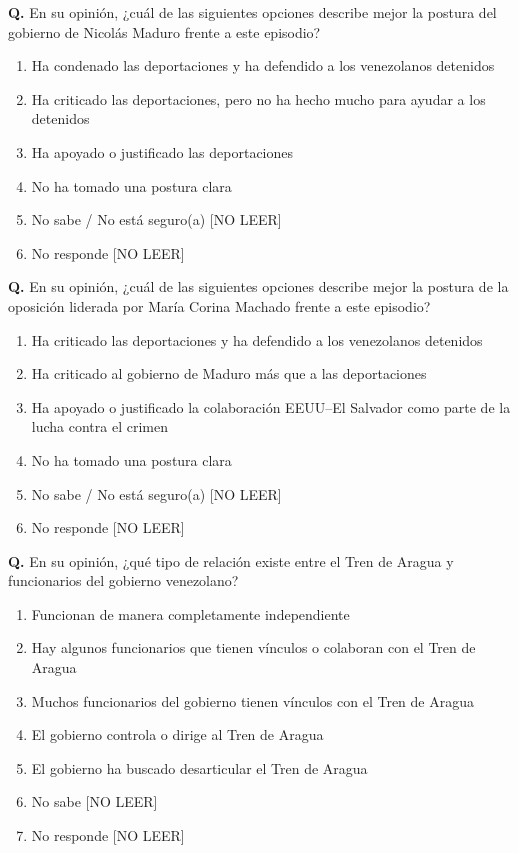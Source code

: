 \documentclass[11pt,letterpaper]{article}
\newcounter{question}
\newcommand{\question}[1]{%
  \stepcounter{question}%
  \vspace{0.3em}%
  \noindent\textbf{Q\thequestion.} #1%
}
\newenvironment{responses}
{\begin{enumerate}[label=(\arabic*), leftmargin=2em, itemsep=0em, parsep=0em, topsep=0em]}
{\end{enumerate}\vspace{0.3em}}
\begin{document}
\question{En su opinión, ¿cuál de las siguientes opciones describe mejor la postura del gobierno de Nicolás Maduro frente a este episodio?}
\begin{responses}
\item Ha condenado las deportaciones y ha defendido a los venezolanos detenidos
\item Ha criticado las deportaciones, pero no ha hecho mucho para ayudar a los detenidos
\item Ha apoyado o justificado las deportaciones
\item No ha tomado una postura clara
\item[(98)] No sabe / No está seguro(a) [NO LEER]
\item[(99)] No responde [NO LEER]
\end{responses}

\question{En su opinión, ¿cuál de las siguientes opciones describe mejor la postura de la oposición liderada por María Corina Machado frente a este episodio?}
\begin{responses}
\item Ha criticado las deportaciones y ha defendido a los venezolanos detenidos
\item Ha criticado al gobierno de Maduro más que a las deportaciones
\item Ha apoyado o justificado la colaboración EEUU–El Salvador como parte de la lucha contra el crimen
\item No ha tomado una postura clara
\item[(98)] No sabe / No está seguro(a) [NO LEER]
\item[(99)] No responde [NO LEER]
\end{responses}

\question{En su opinión, ¿qué tipo de relación existe entre el Tren de Aragua y funcionarios del gobierno venezolano?}
\begin{responses}
\item Funcionan de manera completamente independiente
\item Hay algunos funcionarios que tienen vínculos o colaboran con el Tren de Aragua
\item Muchos funcionarios del gobierno tienen vínculos con el Tren de Aragua
\item El gobierno controla o dirige al Tren de Aragua
\item El gobierno ha buscado desarticular el Tren de Aragua
\item[(98)] No sabe [NO LEER]
\item[(99)] No responde [NO LEER]
\end{responses}
\end{document}
